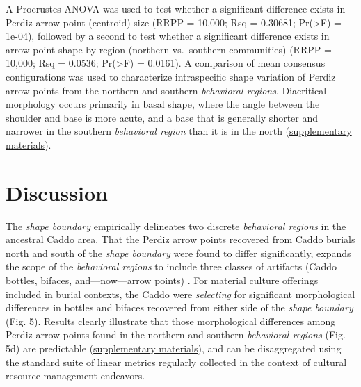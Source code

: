 \documentclass[smallextended]{svjour3}       %
\begin{document}
A Procrustes ANOVA was used to test whether a significant difference
exists in Perdiz arrow point (centroid) size (RRPP = 10,000; Rsq =
0.30681; Pr(\textgreater F) = 1e-04), followed by a second to test
whether a significant difference exists in arrow point shape by region
(northern vs.~southern communities) (RRPP = 10,000; Rsq = 0.0536;
Pr(\textgreater F) = 0.0161). A comparison of mean consensus
configurations was used to characterize intraspecific shape variation of
Perdiz arrow points from the northern and southern \emph{behavioral
regions}. Diacritical morphology occurs primarily in basal shape, where
the angle between the shoulder and base is more acute, and a base that
is generally shorter and narrower in the southern \emph{behavioral
region} than it is in the north
(\href{https://seldenlab.github.io/perdiz3/}{supplementary materials}).

\hypertarget{discussion}{%
\section{Discussion}\label{discussion}}

The \emph{shape boundary} empirically delineates two discrete
\emph{behavioral regions} in the ancestral Caddo area. That the Perdiz
arrow points recovered from Caddo burials north and south of the
\emph{shape boundary} were found to differ significantly, expands the
scope of the \emph{behavioral regions} to include three classes of
artifacts (Caddo bottles, bifaces, and---now---arrow points)
\cite{RN8074,RN7927,RN8370,RN8312,RN8322,RN8158}. For material culture
offerings included in burial contexts, the Caddo were \emph{selecting}
for significant morphological differences in bottles and bifaces
recovered from either side of the \emph{shape boundary} (Fig. 5).
Results clearly illustrate that those morphological differences among
Perdiz arrow points found in the northern and southern \emph{behavioral
regions} (Fig. 5d) are predictable
(\href{https://seldenlab.github.io/perdiz3/}{supplementary materials}),
and can be disaggregated using the standard suite of linear metrics
regularly collected in the context of cultural resource management
endeavors.
\end{document}
